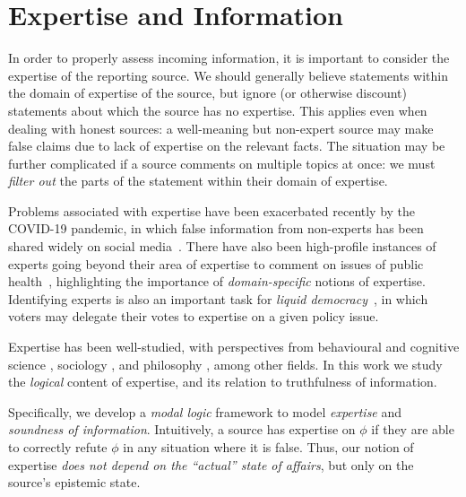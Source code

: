 \chapter{Expertise and Information}
\label{chapter_expertise}

In order to properly assess incoming information, it is important to consider
the expertise of the reporting source. We should generally believe statements
within the domain of expertise of the source, but ignore (or otherwise
discount) statements about which the source has no expertise. This applies even
when dealing with honest sources: a well-meaning but non-expert source may make
false claims due to lack of expertise on the relevant facts.
%
The situation may be further complicated if a source comments on multiple
topics at once: we must \emph{filter out} the parts of the statement within
their domain of expertise.

Problems associated with expertise have been exacerbated recently by the
COVID-19 pandemic, in which false information from non-experts has been shared
widely on social media~\cite{Llewellynm1160,dijck2020}. There have also been
high-profile instances of experts going beyond their area of expertise to
comment on issues of public health~\cite{xaudiera2020ibuprofen}, highlighting
the importance of \emph{domain-specific} notions of expertise. Identifying
experts is also an important task for \emph{liquid
democracy}~\cite{blum2016liquid}, in which voters may delegate their votes to
expertise on a given policy issue.

Expertise has been well-studied, with perspectives from behavioural and
cognitive science \cite{chi2014nature,ericsson2010expertise}, sociology
\cite{collins2008rethinking}, and philosophy
\cite{kilov2021brittleness,whyte2010trust,goldman2018expertise}, among other
fields. In this work we study the \emph{logical} content of expertise, and its
relation to truthfulness of information.

Specifically, we develop a \emph{modal logic} framework to model
\emph{expertise} and \emph{soundness of information}. Intuitively, a source has
expertise on $\phi$ if they are able to correctly refute $\phi$ in any
situation where it is false.\footnotemark{} Thus, our notion of expertise
\emph{does not depend on the ``actual'' state of affairs}, but only on the
source's epistemic state.


